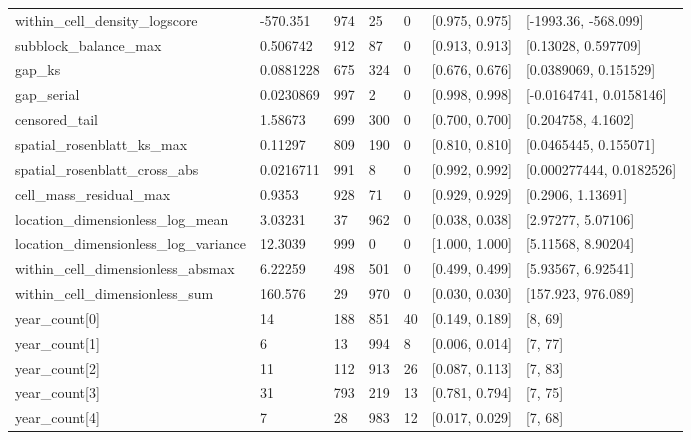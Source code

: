\begin{longtable}
{}within\_\allowbreak{}cell\_\allowbreak{}density\_\allowbreak{}logscore & -570.351 & 974 & 25 & 0 & [0.975, 0.975] & [-1993.36, -568.099] \\
{}subblock\_\allowbreak{}balance\_\allowbreak{}max & 0.506742 & 912 & 87 & 0 & [0.913, 0.913] & [0.13028, 0.597709] \\
{}gap\_\allowbreak{}ks & 0.0881228 & 675 & 324 & 0 & [0.676, 0.676] & [0.0389069, 0.151529] \\
{}gap\_\allowbreak{}serial & 0.0230869 & 997 & 2 & 0 & [0.998, 0.998] & [-0.0164741, 0.0158146] \\
{}censored\_\allowbreak{}tail & 1.58673 & 699 & 300 & 0 & [0.700, 0.700] & [0.204758, 4.1602] \\
{}spatial\_\allowbreak{}rosenblatt\_\allowbreak{}ks\_\allowbreak{}max & 0.11297 & 809 & 190 & 0 & [0.810, 0.810] & [0.0465445, 0.155071] \\
{}spatial\_\allowbreak{}rosenblatt\_\allowbreak{}cross\_\allowbreak{}abs & 0.0216711 & 991 & 8 & 0 & [0.992, 0.992] & [0.000277444, 0.0182526] \\
{}cell\_\allowbreak{}mass\_\allowbreak{}residual\_\allowbreak{}max & 0.9353 & 928 & 71 & 0 & [0.929, 0.929] & [0.2906, 1.13691] \\
{}location\_\allowbreak{}dimensionless\_\allowbreak{}log\_\allowbreak{}mean & 3.03231 & 37 & 962 & 0 & [0.038, 0.038] & [2.97277, 5.07106] \\
{}location\_\allowbreak{}dimensionless\_\allowbreak{}log\_\allowbreak{}variance & 12.3039 & 999 & 0 & 0 & [1.000, 1.000] & [5.11568, 8.90204] \\
{}within\_\allowbreak{}cell\_\allowbreak{}dimensionless\_\allowbreak{}absmax & 6.22259 & 498 & 501 & 0 & [0.499, 0.499] & [5.93567, 6.92541] \\
{}within\_\allowbreak{}cell\_\allowbreak{}dimensionless\_\allowbreak{}sum & 160.576 & 29 & 970 & 0 & [0.030, 0.030] & [157.923, 976.089] \\
{}year\_\allowbreak{}count[0] & 14 & 188 & 851 & 40 & [0.149, 0.189] & [8, 69] \\
{}year\_\allowbreak{}count[1] & 6 & 13 & 994 & 8 & [0.006, 0.014] & [7, 77] \\
{}year\_\allowbreak{}count[2] & 11 & 112 & 913 & 26 & [0.087, 0.113] & [7, 83] \\
{}year\_\allowbreak{}count[3] & 31 & 793 & 219 & 13 & [0.781, 0.794] & [7, 75] \\
{}year\_\allowbreak{}count[4] & 7 & 28 & 983 & 12 & [0.017, 0.029] & [7, 68] \\

\end{longtable}
